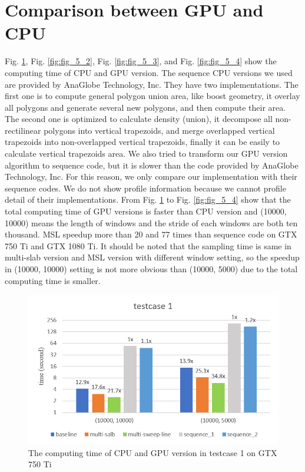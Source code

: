 \section{Comparison between GPU and CPU}
Fig. \ref{fig:fig_5_1}, Fig. \ref{fig:fig_5_2}, Fig. \ref{fig:fig_5_3}, and Fig. \ref{fig:fig_5_4} show the computing time of CPU and GPU version. The sequence CPU versions we used are provided by AnaGlobe Technology, Inc. They have two implementations. The first one is to compute general polygon union area, like boost geometry, it overlay all polygons and generate several new polygons, and then compute their area. The second one is optimized to calculate density (union), it decompose all non-rectilinear polygons into vertical trapezoids, and merge overlapped vertical trapezoids into non-overlapped vertical trapezoids, finally it can be easily to calculate vertical trapezoids area. We also tried to transform our GPU version algorithm to sequence code, but it is slower than the code provided by AnaGlobe Technology, Inc. For this reason, we only compare our implementation with their sequence codes. We do not show profile information because we cannot profile detail of their implementations. From Fig. \ref{fig:fig_5_1} to Fig. \ref{fig:fig_5_4} show that the total computing time of GPU versions is faster than CPU version and (10000, 10000) means the length of windows and the stride of each windows are both ten thousand. MSL speedup more than 20 and  77 times than sequence code on GTX 750 Ti and GTX 1080 Ti. It should be noted that the sampling time is same in multi-slab version and MSL version with different window setting, so the speedup in (10000, 10000) setting is not more obvious than (10000, 5000) due to the total computing time is smaller.

\begin{figure}[h]
    \centering
    \includegraphics[scale=0.7]{image/fig_5_1}
    \caption{The computing time of CPU and GPU version in testcase 1 on GTX 750 Ti}
    \label{fig:fig_5_1}
\end{figure}

